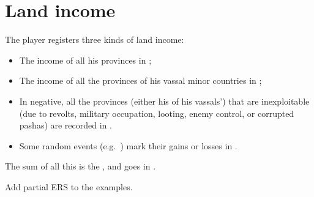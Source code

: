 \section{Land income}\label{chIncomes:LandIncome}
\aparag The player registers three kinds of land income:
\begin{itemize}
\item The income of all his provinces in ;
\item The income of all the provinces of his vassal minor countries in
  ;
\item In negative, all the provinces (either his of his vassals') that
  are inexploitable (due to revolts, military occupation, looting, enemy
  control, or corrupted pashas) are recorded in
  .
\item Some random events (e.g.~) mark their
gains or losses in .
\end{itemize}
\bparag The sum of all this is the , and goes in
.

\begin{todo}
  Add partial ERS to the examples.
\end{todo}

